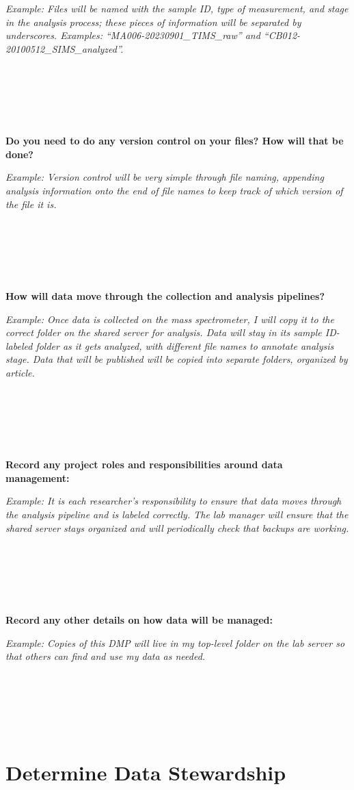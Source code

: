 \documentclass[
]{book}
\begin{document}
\emph{Example: Files will be named with the sample ID, type of measurement, and stage in the analysis process; these pieces of information will be separated by underscores. Examples: ``MA006-20230901\_TIMS\_raw'' and ``CB012-20100512\_SIMS\_analyzed''.}

~

~

~

\textbf{Do you need to do any version control on your files? How will that be done?}

\emph{Example: Version control will be very simple through file naming, appending analysis information onto the end of file names to keep track of which version of the file it is.}

~

~

~

\textbf{How will data move through the collection and analysis pipelines?}

\emph{Example: Once data is collected on the mass spectrometer, I will copy it to the correct folder on the shared server for analysis. Data will stay in its sample ID-labeled folder as it gets analyzed, with different file names to annotate analysis stage. Data that will be published will be copied into separate folders, organized by article.}

~

~

~

\textbf{Record any project roles and responsibilities around data management:}

\emph{Example: It is each researcher's responsibility to ensure that data moves through the analysis pipeline and is labeled correctly. The lab manager will ensure that the shared server stays organized and will periodically check that backups are working.}

~

~

~

\textbf{Record any other details on how data will be managed:}

\emph{Example: Copies of this DMP will live in my top-level folder on the lab server so that others can find and use my data as needed.}

~

~

~

\hypertarget{data-governance}{%
\section{Determine Data Stewardship}\label{data-governance}}
\end{document}

